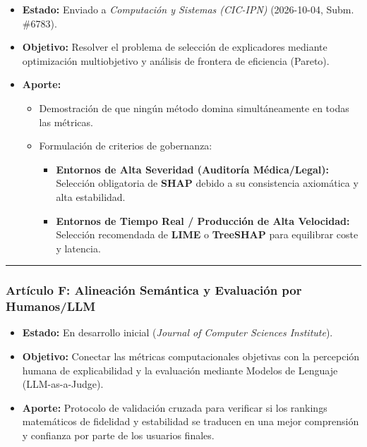\documentclass[
]{article}
\providecommand{\tightlist}{%
  \setlength{\itemsep}{0pt}\setlength{\parskip}{0pt}}
\begin{document}
\begin{itemize}
\tightlist
\item
  \textbf{Estado:} Enviado a \emph{Computación y Sistemas (CIC-IPN)}
  (2026-10-04, Subm. \#6783).
\item
  \textbf{Objetivo:} Resolver el problema de selección de explicadores
  mediante optimización multiobjetivo y análisis de frontera de
  eficiencia (Pareto).
\item
  \textbf{Aporte:}

  \begin{itemize}
  \tightlist
  \item
    Demostración de que ningún método domina simultáneamente en todas
    las métricas.
  \item
    Formulación de criterios de gobernanza:

    \begin{itemize}
    \tightlist
    \item
      \textbf{Entornos de Alta Severidad (Auditoría Médica/Legal):}
      Selección obligatoria de \textbf{SHAP} debido a su consistencia
      axiomática y alta estabilidad.
    \item
      \textbf{Entornos de Tiempo Real / Producción de Alta Velocidad:}
      Selección recomendada de \textbf{LIME} o \textbf{TreeSHAP} para
      equilibrar coste y latencia.
    \end{itemize}
  \end{itemize}
\end{itemize}

\begin{center}\rule{0.5\linewidth}{0.5pt}\end{center}

\subsubsection{Artículo F: Alineación Semántica y Evaluación por
Humanos/LLM}\label{artuxedculo-f-alineaciuxf3n-semuxe1ntica-y-evaluaciuxf3n-por-humanosllm}

\begin{itemize}
\tightlist
\item
  \textbf{Estado:} En desarrollo inicial (\emph{Journal of Computer
  Sciences Institute}).
\item
  \textbf{Objetivo:} Conectar las métricas computacionales objetivas con
  la percepción humana de explicabilidad y la evaluación mediante
  Modelos de Lenguaje (LLM-as-a-Judge).
\item
  \textbf{Aporte:} Protocolo de validación cruzada para verificar si los
  rankings matemáticos de fidelidad y estabilidad se traducen en una
  mejor comprensión y confianza por parte de los usuarios finales.
\end{itemize}
\end{document}
